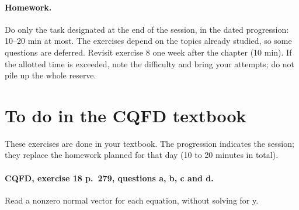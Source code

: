 \paragraph{Homework.} Do only the task designated at the end of the session, in the dated progression: 10--20 min at most. The exercises depend on the topics already studied, so some questions are deferred. Revisit exercise 8 one week after the chapter (10 min). If the allotted time is exceeded, note the difficulty and bring your attempts; do not pile up the whole reserve.
\endgroup
{}\section*{To do in the CQFD textbook}
These exercises are done in your textbook. The progression indicates the session; they replace the homework planned for that day (10 to 20 minutes in total).
\paragraph{CQFD, exercise 18 p.~279, questions a, b, c and d.}\label{C07-M1} Read a nonzero normal vector for each equation, without solving for y.
